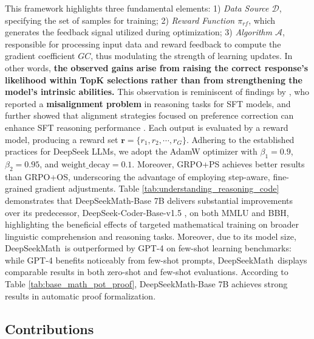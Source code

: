 \begin{itemize}[topsep=0pt]
\begin{itemize}
This framework highlights three fundamental elements: 1) \textit{Data Source $\mathcal{D}$}, specifying the set of samples for training; 2) \textit{Reward Function $\pi_{{rf}}$}, which generates the feedback signal utilized during optimization; 3) \textit{Algorithm $\mathcal{A}$}, responsible for processing input data and reward feedback to compute the gradient coefficient $GC$, thus modulating the strength of learning updates. In other words, \textbf{the observed gains arise from raising the correct response’s likelihood within TopK selections rather than from strengthening the model’s intrinsic abilities.} This observation is reminiscent of findings by \citep{wang2023making}, who reported a \textbf{misalignment problem} in reasoning tasks for SFT models, and further showed that alignment strategies focused on preference correction can enhance SFT reasoning performance \citep{yuan2023rrhf,song2023preference,wang2023making}. Each output is evaluated by a reward model, producing a reward set $\mathbf{r}=\{r_1, r_2, \cdots, r_G\}$. Adhering to the established practices for DeepSeek LLMs, we adopt the AdamW optimizer \citep{adamW} with $\beta_1=0.9$, $\beta_2=0.95$, and $\mathrm{weight\_decay}=0.1$. Moreover, GRPO+PS achieves better results than GRPO+OS, underscoring the advantage of employing step-aware, fine-grained gradient adjustments. Table \ref{tab:understanding_reasoning_code} demonstrates that DeepSeekMath-Base 7B delivers substantial improvements over its predecessor, DeepSeek-Coder-Base-v1.5 \citep{deepseek-coder}, on both MMLU and BBH, highlighting the beneficial effects of targeted mathematical training on broader linguistic comprehension and reasoning tasks. Moreover, due to its model size, DeepSeekMath~is outperformed by GPT-4 on few-shot learning benchmarks: while GPT-4 benefits noticeably from few-shot prompts, DeepSeekMath~displays comparable results in both zero-shot and few-shot evaluations. According to Table \ref{tab:base_math_pot_proof}, DeepSeekMath-Base 7B achieves strong results in automatic proof formalization. \subsection{Contributions}

\end{itemize}
\end{itemize}
